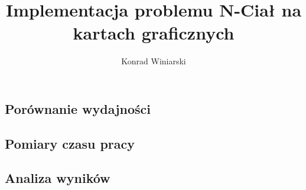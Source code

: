 \documentclass[12pt]{article}
\author{Konrad Winiarski}
\title{Implementacja problemu N-Ciał na kartach graficznych}
\begin{document}
\maketitle
\pagebreak

\begin{flushleft}














\section { Porównanie wydajności }

\subsection {Pomiary czasu pracy}
\subsection {Analiza wyników}





\end{flushleft}
\end{document}
